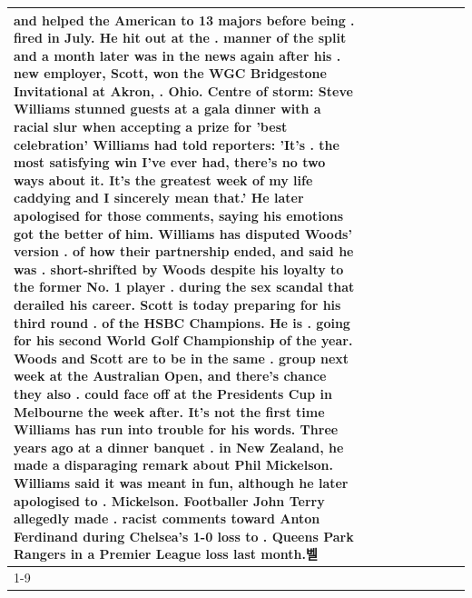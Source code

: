 \begin{table}[H]
\begin{tabular}{lllrlllll}
and helped the American to 13 majors before being . fired in July. He hit out at the . manner of the split and a month later was in the news again after his . new employer, Scott, won the WGC Bridgestone Invitational at Akron, . Ohio. Centre of storm: Steve Williams stunned guests at a gala dinner with a racial slur when accepting a prize for 'best celebration' Williams had told reporters: 'It's . the most satisfying win I've ever had, there's no two ways about it. It's the greatest week of my life caddying and I sincerely mean that.' He later apologised for those comments, saying his emotions got the better of him. Williams has disputed Woods' version . of how their partnership ended, and said he was . short-shrifted by Woods despite his loyalty to the former No. 1 player . during the sex scandal that derailed his career. Scott is today preparing for his third round . of the HSBC Champions. He is . going for his second World Golf Championship of the year. Woods and Scott are to be in the same . group next week at the Australian Open, and there's chance they also . could face off at the Presidents Cup in Melbourne the week after. It's not the first time Williams has run into trouble for his words. Three years ago at a dinner banquet . in New Zealand, he made a disparaging remark about Phil Mickelson. Williams said it was meant in fun, although he later apologised to . Mickelson. Footballer John Terry allegedly made . racist comments toward Anton Ferdinand during Chelsea's 1-0 loss to . Queens Park Rangers in a Premier League loss last month.벨 \\
\cline{1-9}

\end{tabular}
\end{table}
